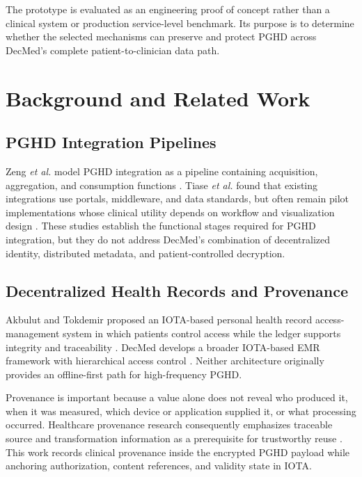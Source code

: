 The prototype is evaluated as an engineering proof of concept rather than a clinical system or production service-level benchmark.
Its purpose is to determine whether the selected mechanisms can preserve and protect PGHD across DecMed's complete patient-to-clinician data path.

\section{Background and Related Work}

\subsection{PGHD Integration Pipelines}

Zeng \textit{et al.} model PGHD integration as a pipeline containing acquisition, aggregation, and consumption functions \cite{Zeng2022-Standardized-PGD}.
Tiase \textit{et al.} found that existing integrations use portals, middleware, and data standards, but often remain pilot implementations whose clinical utility depends on workflow and visualization design \cite{Tiase2020-PGHD_EHR_Integration}.
These studies establish the functional stages required for PGHD integration, but they do not address DecMed's combination of decentralized identity, distributed metadata, and patient-controlled decryption.

\subsection{Decentralized Health Records and Provenance}

Akbulut and Tokdemir proposed an IOTA-based personal health record access-management system in which patients control access while the ledger supports integrity and traceability \cite{Akbulut_2020_iota_phr}.
DecMed develops a broader IOTA-based EMR framework with hierarchical access control \cite{Purnama_2026}.
Neither architecture originally provides an offline-first path for high-frequency PGHD.

Provenance is important because a value alone does not reveal who produced it, when it was measured, which device or application supplied it, or what processing occurred.
Healthcare provenance research consequently emphasizes traceable source and transformation information as a prerequisite for trustworthy reuse \cite{Ahmed_2023_Data_Provenance}.
This work records clinical provenance inside the encrypted PGHD payload while anchoring authorization, content references, and validity state in IOTA.

